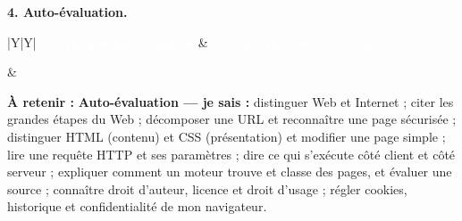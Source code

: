 \documentclass[11pt,a4paper]{article}
\newcommand{\aretenir}[1]{\begin{retenir}\raggedright\textbf{À retenir :} #1\end{retenir}}
\newcommand{\entete}{\rowcolor{navy}}
\newcommand{\hd}[1]{\textcolor{white}{\textbf{#1}}}
\begin{document}
\textbf{4. Auto-évaluation.}

\smallskip
\noindent\begin{tabularx}{\linewidth}{|Y|Y|}\hline
\entete \hd{Ce que j'ai bien compris} & \hd{Ce qu'il me reste à revoir}\\\hline
\rule{0pt}{16mm} & \\\hline
\end{tabularx}

\aretenir{\textbf{Auto-évaluation — je sais :} distinguer Web et Internet ; citer les grandes étapes du Web ; décomposer une URL et reconnaître une page sécurisée ; distinguer HTML (contenu) et CSS (présentation) et modifier une page simple ; lire une requête HTTP et ses paramètres ; dire ce qui s'exécute côté client et côté serveur ; expliquer comment un moteur trouve et classe des pages, et évaluer une source ; connaître droit d'auteur, licence et droit d'usage ; régler cookies, historique et confidentialité de mon navigateur.}
\end{document}

